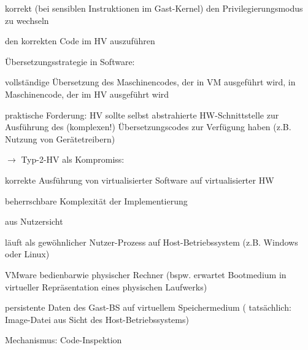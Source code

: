 \documentclass[a4paper]{article}
\begin{document}
\begin{multicols}{3}
\begin{itemize*}
\begin{enumerate*}
            \item korrekt (bei sensiblen Instruktionen im Gast-Kernel) den Privilegierungsmodus zu wechseln
            \item den korrekten Code im HV auszuführen
        \end{enumerate*}
    \end{itemize*}

    Übersetzungsstrategie in Software:

    \begin{itemize*}
        \item
        vollständige Übersetzung des Maschinencodes, der in VM ausgeführt
        wird, in Maschinencode, der im HV ausgeführt wird
        \item
        praktische Forderung: HV sollte selbst abstrahierte HW-Schnittstelle
        zur Ausführung des (komplexen!) Übersetzungscodes zur Verfügung haben
        (z.B. Nutzung von Gerätetreibern)
        \item
        $\rightarrow$ Typ-2-HV als Kompromiss:
        \begin{itemize*}
            \item korrekte Ausführung von virtualisierter Software auf virtualisierter HW
            \item beherrschbare Komplexität der Implementierung
        \end{itemize*}
    \end{itemize*}

    aus Nutzersicht

    \begin{itemize*}
        \item
        läuft als gewöhnlicher Nutzer-Prozess auf Host-Betriebssystem (z.B.
        Windows oder Linux)
        \item
        VMware bedienbarwie physischer Rechner (bspw. erwartet Bootmedium in
        virtueller Repräsentation eines physischen Laufwerks)
        \item
        persistente Daten des Gast-BS auf virtuellem Speichermedium (
        tatsächlich: Image-Datei aus Sicht des Host-Betriebssystems)
    \end{itemize*}

    Mechanismus: Code-Inspektion


\end{multicols}
\end{document}
